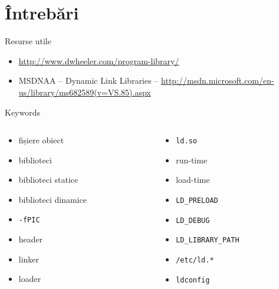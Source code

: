 \documentclass{beamer}
\begin{document}
\section{Întrebări}

\begin{frame}{Resurse utile}
  \begin{itemize}
    \item \url{http://www.dwheeler.com/program-library/}
    \item MSDNAA -- Dynamic Link Libraries --
    \url{http://msdn.microsoft.com/en-us/library/ms682589(v=VS.85).aspx}
  \end{itemize}
\end{frame}

\begin{frame}{Keywords}
  \begin{columns}
    \begin{column}[l]{0.5\textwidth}
      \begin{itemize}
        \item fișiere obiect
        \item biblioteci
        \item biblioteci statice
        \item biblioteci dinamice
        \item \texttt{-fPIC}
        \item header
        \item linker
        \item loader
      \end{itemize}
    \end{column}
    \begin{column}[l]{0.5\textwidth}
      \begin{itemize}
        \item \texttt{ld.so}
        \item run-time
        \item load-time
        \item \texttt{LD\_PRELOAD}
        \item \texttt{LD\_DEBUG}
        \item \texttt{LD\_LIBRARY\_PATH}
        \item \texttt{/etc/ld.*}
        \item \texttt{ldconfig}
      \end{itemize}
    \end{column}
  \end{columns}
\end{frame}
\end{document}
